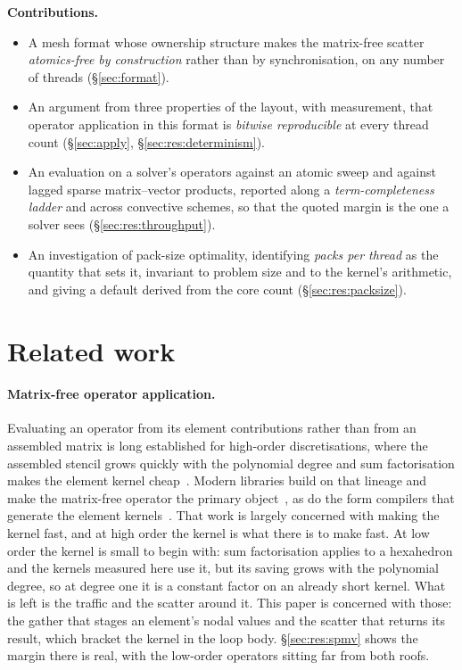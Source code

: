 \documentclass[sigconf,nonacm]{acmart}
\begin{document}
\noindent\textbf{Contributions.}
\begin{itemize}
  \item A mesh format whose ownership structure makes the matrix-free scatter
        \emph{atomics-free by construction} rather than by synchronisation, on any number of
        threads (\S\ref{sec:format}).
  \item An argument from three properties of the layout, with measurement, that operator
        application in this format is \emph{bitwise reproducible} at every thread count
        (\S\ref{sec:apply}, \S\ref{sec:res:determinism}).
  \item An evaluation on a solver's operators against an atomic sweep and against lagged
        sparse matrix--vector products, reported along a \emph{term-completeness ladder} and
        across convective schemes, so that the quoted margin is the one a solver sees
        (\S\ref{sec:res:throughput}).
  \item An investigation of pack-size optimality, identifying \emph{packs per thread} as the
        quantity that sets it, invariant to problem size and to the kernel's arithmetic, and
        giving a default derived from the core count (\S\ref{sec:res:packsize}).
\end{itemize}

\section{Related work}
\label{sec:related}

\paragraph{Matrix-free operator application.} Evaluating an operator from its element
contributions rather than from an assembled matrix is long established for high-order
discretisations, where the assembled stencil grows quickly with the polynomial degree and sum
factorisation makes the element kernel cheap~\cite{Orszag1980,DevilleFischerMund2002,Brown2010}.
Modern libraries build on that lineage and make the matrix-free operator the primary
object~\cite{KronbichlerKormann2012,KronbichlerKormann2019,MFEM2021,libCEED2021,Kolev2021}, as
do the form compilers that generate the element kernels~\cite{KirbyLogg2006,Firedrake2016}. That
work is largely concerned with making the kernel fast, and at high order the kernel is what
there is to make fast. At low order the kernel is small to begin with: sum factorisation applies
to a hexahedron and the kernels measured here use it, but its saving grows with the polynomial
degree, so at degree one it is a constant factor on an already short kernel. What is left is the
traffic and the scatter around it. This paper is concerned with those: the gather that stages an
element's nodal values and the scatter that returns its result, which bracket the kernel in the
loop body. \S\ref{sec:res:spmv} shows the margin there is real, with the low-order operators
sitting far from both roofs.
\end{document}
